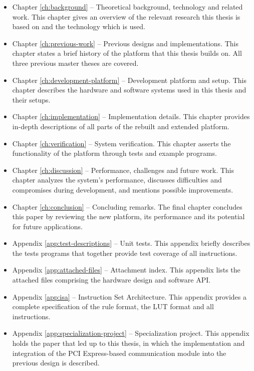 \begin{itemize}
    \item Chapter \ref{ch:background} –
        Theoretical background, technology and related work.
        This chapter gives an overview of the relevant research this thesis is based on and the technology which is used.
    \item Chapter \ref{ch:previous-work} –
        Previous designs and implementations.
        This chapter states a brief history of the platform that this thesis builds on.
        All three previous master theses are covered.
    \item Chapter \ref{ch:development-platform} –
        Development platform and setup.
        This chapter describes the hardware and software systems used in this thesis and their setups.
    \item Chapter \ref{ch:implementation} –
        Implementation details.
        This chapter provides in-depth descriptions of all parts of the rebuilt and extended platform.
    \item Chapter \ref{ch:verification} –
        System verification.
        This chapter asserts the functionality of the platform through tests and example programs.
    \item Chapter \ref{ch:discussion} –
        Performance, challenges and future work.
        This chapter analyzes the system's performance, discusses difficulties and compromises during development, and mentions possible improvements.
    \item Chapter \ref{ch:conclusion} –
        Concluding remarks.
        The final chapter concludes this paper by reviewing the new platform, its performance and its potential for future applications.
    \item Appendix \ref{app:test-descriptions} –
        Unit tests.
        This appendix briefly describes the tests programs that together provide test coverage of all instructions.
    \item Appendix \ref{app:attached-files} –
        Attachment index.
        This appendix lists the attached files comprising the hardware design and software API.
    \item Appendix \ref{app:isa} –
        Instruction Set Architecture.
        This appendix provides a complete specification of the rule format, the LUT format and all instructions.
    \item Appendix \ref{app:specialization-project} –
        Specialization project.
        This appendix holds the paper that led up to this thesis, in which the implementation and integration of the PCI Express-based communication module into the previous design is described.
\end{itemize}
